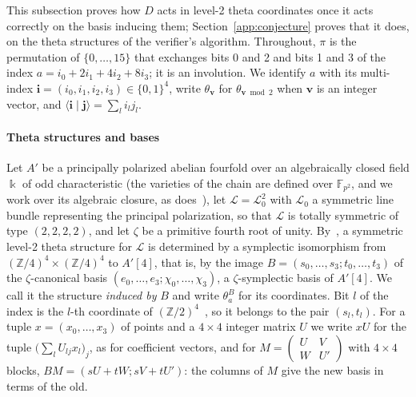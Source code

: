 \documentclass[version=preprint]{iacrcc}
\begin{document}
    This subsection proves how $D$ acts in level-2 theta coordinates once it
    acts correctly on the basis inducing them; Section~\ref{app:conjecture}
    proves that it does, on the theta structures of the verifier's algorithm.
    Throughout, $\pi$ is the permutation of $\{0, \ldots, 15\}$ that exchanges
    bits 0 and 2 and bits 1 and 3 of the index $a = i_0 + 2 i_1 + 4 i_2 + 8
    i_3$; it is an involution. We identify $a$ with its multi-index $\mathbf i =
    (i_0, i_1, i_2, i_3) \in \{0, 1\}^4$, write $\theta_{\mathbf v}$ for
    $\theta_{\mathbf v \bmod 2}$ when $\mathbf v$ is an integer vector, and
    $\langle \mathbf i \mid \mathbf j \rangle = \sum_l i_l j_l$.

    \paragraph{Theta structures and bases}
    Let $A'$ be a principally polarized abelian fourfold over an algebraically
    closed field $\Bbbk$ of odd characteristic (the varieties of the chain are
    defined over $\mathbb F_{p^2}$, and we work over its algebraic closure, as
    does~\cite[Section 2]{Dar24}), let $\mathcal L = \mathcal L_0^2$ with $\mathcal L_0$ a
    symmetric line bundle representing the principal polarization, so that
    $\mathcal L$ is totally symmetric of type $(2, 2, 2, 2)$, and let $\zeta$ be
    a primitive fourth root of unity. By~\cite[Theorem 5]{Dar24}, a symmetric
    level-2 theta structure for $\mathcal L$ is determined by a symplectic
    isomorphism from $(\mathbb Z/4)^4 \times (\mathbb Z/4)^4$ to $A'[4]$, that
    is, by the image $B = (s_0, \ldots, s_3; t_0, \ldots, t_3)$ of the
    $\zeta$-canonical basis $(e_0, \ldots, e_3; \chi_0, \ldots, \chi_3)$, a
    $\zeta$-symplectic basis of $A'[4]$. We call it the structure
    \emph{induced by} $B$ and write $\theta^B_a$ for its coordinates. Bit $l$ of
    the index is the $l$-th coordinate of $(\mathbb Z/2)^4$~\cite[Section
    3.2]{Dar24}, so it belongs to the pair $(s_l, t_l)$. For a tuple $x = (x_0,
    \ldots, x_3)$ of points and a $4 \times 4$ integer matrix $U$ we write $xU$
    for the tuple $\bigl(\sum_l U_{lj} x_l\bigr)_j$, as for coefficient
    vectors, and for $M = \left(\begin{smallmatrix} U & V \\ W & U'
    \end{smallmatrix}\right)$ with $4 \times 4$ blocks, $BM = (sU + tW; sV +
    tU')$: the columns of $M$ give the new basis in terms of the old.
\end{document}
